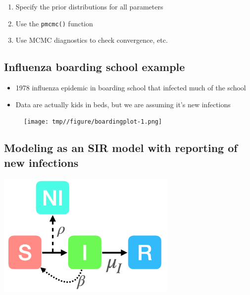 \documentclass[
  letterpaper,
  DIV=11,
  numbers=noendperiod]{scrartcl}
\providecommand{\tightlist}{%
  \setlength{\itemsep}{0pt}\setlength{\parskip}{0pt}}\usepackage{longtable,booktabs,array}
\begin{document}
\Large

\begin{enumerate}
\def\labelenumi{\arabic{enumi}.}
\tightlist
\item
  Specify the prior distributions for all parameters
\item
  Use the \texttt{pmcmc()} function
\item
  Use MCMC diagnostics to check convergence, etc.
\end{enumerate}

\hypertarget{influenza-boarding-school-example}{%
\subsection{Influenza boarding school
example}\label{influenza-boarding-school-example}}

\large

\begin{itemize}
\tightlist
\item
  1978 influenza epidemic in boarding school that infected much of the
  school
\item
  Data are actually kids in beds, but we are assuming it's new
  infections
\end{itemize}

\begin{figure}[h!]

{\centering \texttt{[image: tmp//figure/boardingplot-1.png]}

}

\end{figure}

\hypertarget{modeling-as-an-sir-model-with-reporting-of-new-infections}{%
\subsection{Modeling as an SIR model with reporting of new
infections}\label{modeling-as-an-sir-model-with-reporting-of-new-infections}}

\begin{center}
  \includegraphics[height=6cm]{../graphics/boarding-school-model.png}
\end{center}
\end{document}

